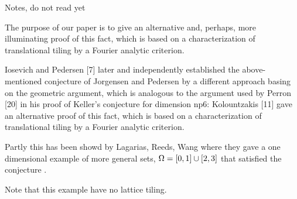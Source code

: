 \documentclass[../thesis.tex]{subfiles}
\begin{document}
\vspace*{3cm}


Notes, do not read yet


The purpose of our paper is to give an alternative and, perhaps, more illuminating proof of this fact, which is based on a characterization of translational tiling by a Fourier analytic criterion.

Iosevich and Pedersen [7] later and independently established the above-mentioned conjecture of Jorgensen and Pedersen by a different approach basing on the geometric argument, which is analogous to the argument used by Perron [20] in his proof of Keller’s conjecture for dimension np6: Kolountzakis [11] gave an alternative proof of this fact, which is based on a characterization of translational tiling by a Fourier analytic criterion. 

Partly this has been showd by Lagarias, Reeds, Wang where they gave a one dimensional example of more general sets, $\Omega=[0,1]\cup [2,3]$  that satisfied the conjecture \cite{lagariasOrthonormalBasesExponentials2000}.

Note that this example have no lattice tiling.


\end{document}
